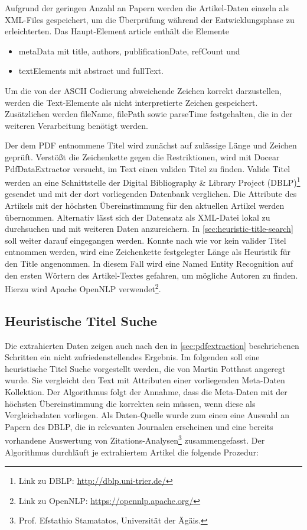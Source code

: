 Aufgrund der geringen Anzahl an Papern werden die
Artikel-Daten einzeln als XML-Files gespeichert, um die
Überprüfung während der Entwicklungsphase zu erleichterten. Das Haupt-Element
article enthält die Elemente 
\begin{itemize}
\item metaData mit title, authors, publificationDate, refCount und
\item textElements mit abstract und fullText. 
\end{itemize}

Um die von der ASCII Codierung abweichende Zeichen korrekt darzustellen,
werden die Text-Elemente  als nicht interpretierte Zeichen gespeichert.
Zusätzlichen werden fileName, filePath sowie parseTime festgehalten,
die in der weiteren Verarbeitung benötigt werden.

Der dem PDF entnommene Titel wird zunächst auf zulässige Länge und
Zeichen geprüft. Verstößt die Zeichenkette gegen die Restriktionen,
wird mit Docear PdfDataExtractor versucht, im Text einen validen Titel
zu finden. Valide Titel werden an eine Schnittstelle der Digital
Bibliography \& Library Project (DBLP)\footnote{Link zu DBLP:
\url{http://dblp.uni-trier.de/}} gesendet und mit der dort
vorliegenden Datenbank verglichen. Die Attribute des Artikels mit der
höchsten Übereinstimmung für den aktuellen Artikel werden
übernommen. Alternativ lässt sich der Datensatz als XML-Datei lokal zu
durchsuchen und mit weiteren Daten anzureichern.  In
\autoref{sec:heuristic-title-search} soll weiter darauf eingegangen
werden.  Konnte nach wie vor kein valider Titel entnommen werden, wird
eine Zeichenkette festgelegter Länge als Heuristik für den Title
angenommen. In diesem Fall wird eine Named Entity Recognition auf den
ersten Wörtern des Artikel-Textes gefahren, um mögliche Autoren zu
finden. Hierzu wird Apache OpenNLP verwendet\footnote{Link zu OpenNLP:
\url{https://opennlp.apache.org/}}.



\subsection{Heuristische Titel Suche}\label{sec:heuristic-title-search}

Die extrahierten Daten zeigen auch nach den in
\autoref{sec:pdfextraction} beschriebenen Schritten ein nicht
zufriedenstellendes Ergebnis. Im folgenden soll eine heuristische
Titel Suche vorgestellt werden, die von Martin Potthast angeregt
wurde. Sie vergleicht den Text mit Attributen einer vorliegenden
Meta-Daten Kollektion. Der Algorithmus folgt der Annahme, dass die
Meta-Daten mit der höchsten Übereinstimmung die korrekten sein müssen,
wenn diese als Vergleichsdaten vorliegen. Als Daten-Quelle wurde zum
einen eine Auswahl an Papern des DBLP, die in relevanten Journalen
erscheinen und eine bereits vorhandene Auswertung von
Zitations-Analysen\footnote{Prof. Efstathio Stamatatos, Universität
der Ägäis.} zusammengefasst. Der Algorithmus durchläuft je extrahiertem
Artikel die folgende Prozedur:

